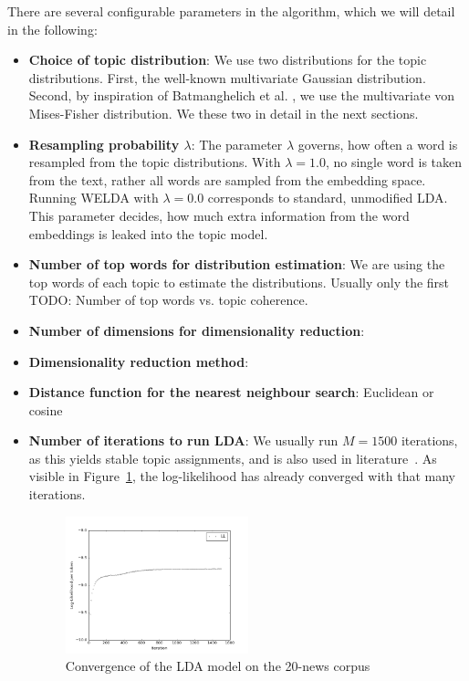 \documentclass[
        a4paper,
        titlepage,
        twoside,
        parskip
        ]{scrbook}
\theoremstyle{break}
\begin{document}
There are several configurable parameters in the algorithm, which we will detail in the following:
\begin{itemize}
  \item \textbf{Choice of topic distribution}:
    We use two distributions for the topic distributions.
    First, the well-known multivariate Gaussian distribution.
    Second, by inspiration of Batmanghelich et al. \cite{Batmanghelich2016}, we use the multivariate von Mises-Fisher distribution.
    We these two in detail in the next sections.
  \item \textbf{Resampling probability $\lambda$}:
    The parameter $\lambda$ governs, how often a word is resampled from the topic distributions.
    With $\lambda = 1.0$, no single word is taken from the text, rather all words are sampled from the embedding space.
    Running WELDA with $\lambda = 0.0$ corresponds to standard, unmodified LDA.
    This parameter decides, how much extra information from the word embeddings is leaked into the topic model.
  \item \textbf{Number of top words for distribution estimation}:
    We are using the top words of each topic to estimate the distributions.
    Usually only the first
    TODO: Number of top words vs. topic coherence.
  \item \textbf{Number of dimensions for dimensionality reduction}:
  \item \textbf{Dimensionality reduction method}:
  \item \textbf{Distance function for the nearest neighbour search}: Euclidean or cosine
  \item \textbf{Number of iterations to run LDA}:
    We usually run $M = 1500$ iterations, as this yields stable topic assignments, and is also used in literature~\cite{Nguyen2015}.
    As visible in Figure~\ref{fig:ll_lda_convergence}, the log-likelihood has already converged with that many iterations.
    \begin{figure}
           \centering
           \includegraphics[width=0.5\textwidth]{figures/ll_lda_convergence.png}
           \caption{Convergence of the LDA model on the 20-news corpus}
           \label{fig:ll_lda_convergence}
    \end{figure}
\end{itemize}
\end{document}

